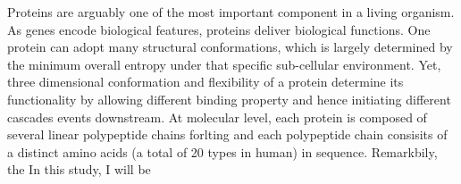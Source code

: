 Proteins are arguably one of the most important component in a living organism. As genes encode biological features, proteins deliver biological functions. One protein can adopt many structural conformations, which is largely determined by the minimum overall entropy under that specific sub-cellular environment. Yet, three dimensional conformation and flexibility of a protein determine its functionality by allowing different binding property and hence initiating different cascades events downstream. At molecular level, each protein is composed of several linear polypeptide chains forlting and each polypeptide chain consisits of a distinct amino acids (a total of 20 types in human) in sequence. Remarkbily, the  In this study, I will be 